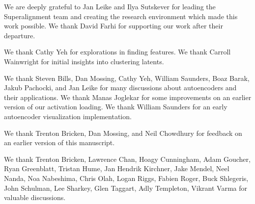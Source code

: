 \documentclass{article}
\begin{document}





\begin{ack}

We are deeply grateful to Jan Leike and Ilya Sutskever for leading the Superalignment team and creating the research environment which made this work possible.  We thank David Farhi for supporting our work after their departure.

We thank Cathy Yeh for explorations in finding features.  We thank Carroll Wainwright for initial insights into clustering latents.  

We thank Steven Bills, Dan Mossing, Cathy Yeh, William Saunders, Boaz Barak, Jakub Pachocki, and Jan Leike for many discussions about autoencoders and their applications.
We thank Manas Joglekar for some improvements on an earlier version of our activation loading. We thank William Saunders for an early autoencoder visualization implementation.

We thank Trenton Bricken, Dan Mossing, and Neil Chowdhury for feedback on an earlier version of this manuscript.

We thank Trenton Bricken, Lawrence Chan, Hoagy Cunningham, Adam Goucher, Ryan Greenblatt, Tristan Hume, Jan Hendrik Kirchner, Jake Mendel, Neel Nanda, Noa Nabeshima, Chris Olah, Logan Riggs, Fabien Roger, Buck Shlegeris, John Schulman, Lee Sharkey, Glen Taggart, Adly Templeton, Vikrant Varma for valuable discussions.





\clearpage

\end{ack}



 

\appendix
















\end{document}
